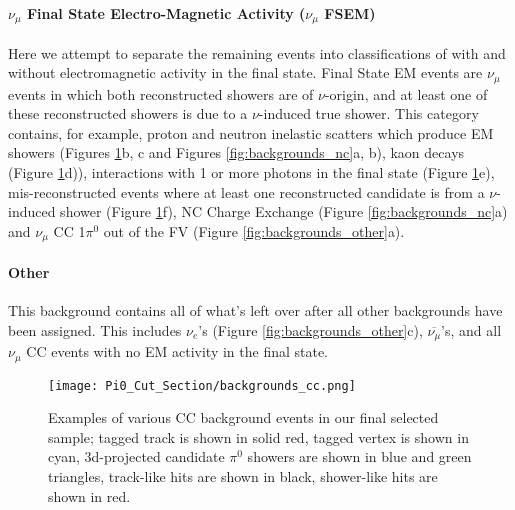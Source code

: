 \paragraph{ $\nu_\mu$ Final State Electro-Magnetic Activity ($\nu_\mu$ FSEM)}
Here we attempt to separate the remaining events into classifications of with and without electromagnetic activity in the final state.  Final State EM events are $\nu_\mu$ events in which both reconstructed showers are of $\nu$-origin, and at least one of these reconstructed showers is due to a $\nu$-induced true shower. This category contains, for example, proton and neutron inelastic scatters which produce EM showers (Figures \ref{fig:backgrounds_cc}b, c and Figures \ref{fig:backgrounds_nc}a, b), kaon decays (Figure \ref{fig:backgrounds_cc}d)),  interactions with 1 or more photons in the final state (Figure \ref{fig:backgrounds_cc}e), mis-reconstructed events where at least one reconstructed candidate is from a $\nu$-induced shower (Figure \ref{fig:backgrounds_cc}f), NC Charge Exchange (Figure \ref{fig:backgrounds_nc}a) and $\nu_\mu$ CC 1$\pi^0$ out of the FV (Figure \ref{fig:backgrounds_other}a).

\paragraph{Other}
This background contains all of what's left over after all other backgrounds have been assigned.  This includes $\nu_e$'s (Figure \ref{fig:backgrounds_other}c), $\overline{\nu_\mu}$'s, and all $\nu_\mu$ CC events with no EM activity in the final state.



\begin{figure}[H]
\centering
\texttt{[image: Pi0\_Cut\_Section/backgrounds\_cc.png]}
\caption{ Examples of various CC background events in our final selected sample; tagged track is shown in solid red, tagged vertex is shown in cyan, 3d-projected candidate $\pi^0$ showers are shown in blue and green triangles, track-like hits are shown in black, shower-like hits are shown in red. }
\label{fig:backgrounds_cc}
\end{figure}

